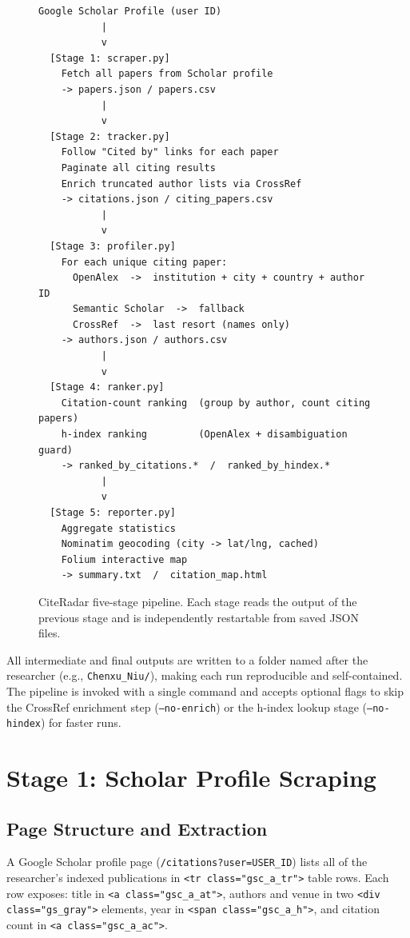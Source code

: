 \documentclass[11pt]{article}
\begin{document}
\begin{figure}[H]
\centering
\begin{lstlisting}[language={}, numbers=none, frame=single]
 Google Scholar Profile (user ID)
           |
           v
  [Stage 1: scraper.py]
    Fetch all papers from Scholar profile
    -> papers.json / papers.csv
           |
           v
  [Stage 2: tracker.py]
    Follow "Cited by" links for each paper
    Paginate all citing results
    Enrich truncated author lists via CrossRef
    -> citations.json / citing_papers.csv
           |
           v
  [Stage 3: profiler.py]
    For each unique citing paper:
      OpenAlex  ->  institution + city + country + author ID
      Semantic Scholar  ->  fallback
      CrossRef  ->  last resort (names only)
    -> authors.json / authors.csv
           |
           v
  [Stage 4: ranker.py]
    Citation-count ranking  (group by author, count citing papers)
    h-index ranking         (OpenAlex + disambiguation guard)
    -> ranked_by_citations.*  /  ranked_by_hindex.*
           |
           v
  [Stage 5: reporter.py]
    Aggregate statistics
    Nominatim geocoding (city -> lat/lng, cached)
    Folium interactive map
    -> summary.txt  /  citation_map.html
\end{lstlisting}
\caption{CiteRadar five-stage pipeline. Each stage reads the output of the
previous stage and is independently restartable from saved JSON files.}
\label{fig:pipeline}
\end{figure}

All intermediate and final outputs are written to a folder named after the
researcher (e.g., \texttt{Chenxu\_Niu/}), making each run reproducible and
self-contained.
The pipeline is invoked with a single command and accepts optional flags to
skip the CrossRef enrichment step (\texttt{--no-enrich}) or the h-index
lookup stage (\texttt{--no-hindex}) for faster runs.


\section{Stage 1: Scholar Profile Scraping}
\label{sec:scraping}

\subsection{Page Structure and Extraction}

A Google Scholar profile page (\texttt{/citations?user=USER\_ID}) lists all
of the researcher's indexed publications in \texttt{<tr class="gsc\_a\_tr">}
table rows.
Each row exposes: title in \texttt{<a class="gsc\_a\_at">}, authors and venue
in two \texttt{<div class="gs\_gray">} elements, year in
\texttt{<span class="gsc\_a\_h">}, and citation count in
\texttt{<a class="gsc\_a\_ac">}.
\end{document}
